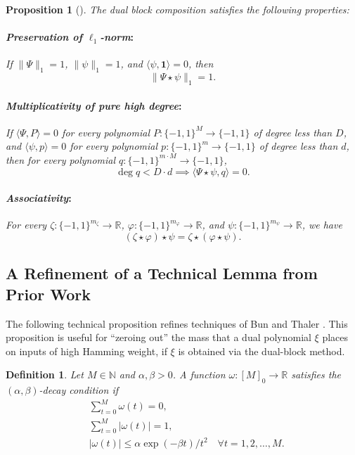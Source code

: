 \documentclass[11pt, letterpaper, fleqn]{article}
\newtheorem{definition}[theorem]{Definition}
\newtheorem{proposition}[theorem]{Proposition}
\theoremstyle{plain}
\newcommand{\R}{\mathbb{R}}
\newcommand{\bits}{\{-1,1\}}
\newcommand{\ls}{\star}
\newcommand{\N}{\mathbb{N}}
\begin{document}
\begin{proposition}[\!\!\cite{sherstovhalfspaces1,adegsurj}] \label{prop:ls}
The dual block composition satisfies the following properties:
\paragraph{\emph{Preservation of $\ell_1$-norm}:} If $\|\Psi\|_1 = 1$, $\|\psi\|_1 = 1$, and $\langle \psi, \mathbf{1}\rangle = 0$, then
\begin{equation}\|\Psi \ls \psi\|_1 = 1. \label{eqn:ls-norm}\end{equation}

\paragraph{\emph{Multiplicativity of pure high degree}:} If $\langle \Psi, P \rangle = 0$ for every polynomial $P \colon \bits^M \to \bits$ of degree less than  $D$, and $\langle \psi, p \rangle = 0$ for every polynomial $p \colon \bits^m \to \bits$ of degree less than $d$, then
for every polynomial $q \colon \bits^{m \cdot M} \to \bits$,
\begin{equation}\deg q < D \cdot d \implies \langle \Psi \ls \psi, q \rangle = 0. \label{eqn:ls-phd} \end{equation}

\paragraph{\emph{Associativity}:} For every $\zeta: \bits^{m_\zeta} \to \R$, $\varphi: \bits^{m_\varphi} \to \R$, and $\psi: \bits^{m_\psi} \to \R$, we have
\begin{equation} (\zeta \ls \varphi) \ls \psi = \zeta \ls (\varphi \ls \psi). \label{eqn:ls-assoc} \end{equation}
\end{proposition}



\subsection{A Refinement of a Technical Lemma from Prior Work}
 The following technical proposition
 refines techniques of Bun and Thaler \cite{adegsurj}. 
This proposition is useful for ``zeroing out'' the mass that 
a dual polynomial $\xi$
places on inputs of high Hamming weight,
if $\xi$ is obtained via the dual-block method.


\begin{definition}
Let $M \in \N$ and $\alpha, \beta > 0$. A function $\omega: [M]_0 \to \R$ satisfies the $(\alpha, \beta)$-decay condition if
\begin{align}
&\sum_{t = 0}^M \omega(t) = 0, \label{eqn:omega-balanced}\\
&\sum_{t = 0}^M |\omega(t)| = 1, \label{eqn:omega-norm}\\
&|\omega(t)| \le \alpha \exp (-\beta t) / t^2 \quad \forall t = 1, 2, \dots, M. \label{eqn:omega-decay}
\end{align}
\end{definition}
\end{document}
